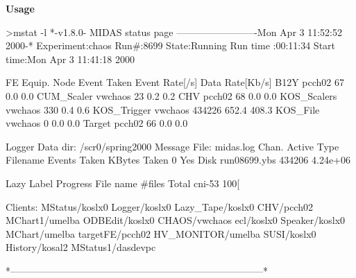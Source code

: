 \begin{DoxyItemize}
\item {\bfseries  Usage } 
\begin{DoxyCode}
 >mstat -l
*-v1.8.0- MIDAS status page -------------------------Mon Apr  3 11:52:52 2000-* 
Experiment:chaos       Run#:8699    State:Running          Run time :00:11:34   
Start time:Mon Apr  3 11:41:18 2000                                             
                                                                                
FE Equip.   Node              Event Taken    Event Rate[/s] Data Rate[Kb/s]     
B12Y        pcch02            67             0.0            0.0                 
CUM_Scaler  vwchaos           23             0.2            0.2                 
CHV         pcch02            68             0.0            0.0                 
KOS_Scalers vwchaos           330            0.4            0.6                 
KOS_Trigger vwchaos           434226         652.4          408.3               
KOS_File    vwchaos           0              0.0            0.0                 
Target      pcch02            66             0.0            0.0 
                                                                                
Logger Data dir: /scr0/spring2000            Message File: midas.log            
Chan.   Active Type      Filename            Events Taken   KBytes Taken        
  0     Yes    Disk      run08699.ybs        434206          4.24e+06           
                                                                                
Lazy Label     Progress  File name           #files         Total               
cni-53         100[%
                                                                                
Clients:  MStatus/koslx0         Logger/koslx0          Lazy_Tape/koslx0        
          CHV/pcch02             MChart1/umelba         ODBEdit/koslx0          
          CHAOS/vwchaos          ecl/koslx0             Speaker/koslx0          
          MChart/umelba          targetFE/pcch02        HV_MONITOR/umelba       
          SUSI/koslx0            History/kosal2         MStatus1/dasdevpc  
     
*------------------------------------------------------------------------------*
\end{DoxyCode}

\end{DoxyItemize}





